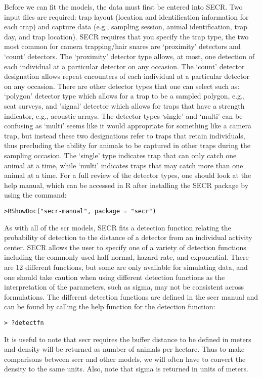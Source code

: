 Before we can fit the models, the data must first be entered into
SECR.  Two input files are required: trap layout (location and
identification information for each trap) and capture data (e.g.,
sampling session, animal identification, trap day, and trap location).
SECR requires that you specify the trap type, the two most common for
camera trapping/hair snares are ‘proximity’ detectors and ‘count’
detectors.  The `proximity' detector type allows, at most, one
detection of each individual at a particular detector on any occasion.
The ‘count’ detector designation allows repeat encounters of each
individual at a particular detector on any occasion.  There are other
detector types that one can select such as: `polygon' detector type
which allows for a trap to be a sampled polygon, e.g., scat surveys,
and 'signal' detector which allows for traps that have a strength
indicator, e.g., acoustic arrays.  The detector types ‘single’ and
‘multi’ can be confusing as ‘multi’ seems like it would appropriate
for something like a camera trap, but instead these two designations
refer to traps that retain individuals, thus precluding the ability
for animals to be captured in other traps during the sampling
occasion.  The ‘single’ type indicates trap that can only catch one
animal at a time, while ‘multi’ indicates traps that may catch more
than one animal at a time.  For a full review of the detector types,
one should look at the help manual, which can be accessed in R after
installing the SECR package by using the command:
\begin{verbatim}
>RShowDoc("secr-manual", package = "secr")
\end{verbatim}
As with all of the scr models, SECR fits a detection function relating
the probability of detection to the distance of a detector from an
individual activity center. SECR allows the user to specify one of a
variety of detection functions including the commonly used
half-normal, hazard rate, and exponential.  There are 12 different
functions, but some are only available for simulating data, and one
should take caution when using different detection functions as the
interpretation of the parameters, such as sigma, may not be consistent
across formulations.  The different detection functions are defined in
the secr manual and can be found by calling the help function for the
detection function:
\begin{verbatim}
> ?detectfn
\end{verbatim}
It is useful to note that secr requires the buffer distance to be
defined in meters and density will be returned as number of animals
per hectare.  Thus to make comparisons between secr and other models,
we will often have to convert the density to the same units.  Also,
note that sigma is returned in units of meters.

